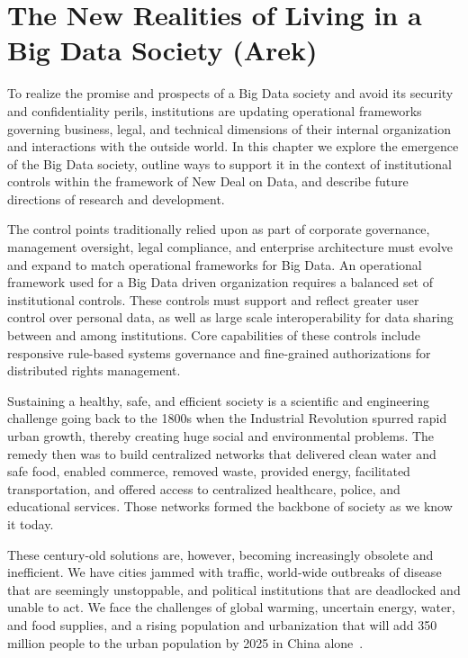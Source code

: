 \section{The New Realities of Living in a Big Data Society (Arek)}

To realize the promise and prospects of a Big Data society and avoid its security and confidentiality perils, institutions are updating operational frameworks governing business, legal, and technical dimensions of their internal organization and interactions with the outside world.
In this chapter we explore the emergence of the Big Data society, outline ways to support it in the context of institutional controls within the framework of New Deal on Data, and describe future directions of research and development.

The control points traditionally relied upon as part of corporate governance, management oversight, legal compliance, and enterprise architecture must evolve and expand to match operational frameworks for Big Data.
An operational framework used for a Big Data driven organization requires a balanced set of institutional controls.
These controls must support and reflect greater user control over personal data, as well as large scale interoperability for data sharing between and among institutions.
Core capabilities of these controls include responsive rule-based systems governance and fine-grained authorizations for distributed rights management.

Sustaining a healthy, safe, and efficient society is a scientific and engineering challenge going back to the 1800s when the Industrial Revolution spurred rapid urban growth, thereby creating huge social and environmental problems.
The remedy then was to build centralized networks that delivered clean water and safe food, enabled commerce, removed waste, provided energy, facilitated transportation, and offered access to centralized healthcare, police, and educational services.
Those networks formed the backbone of society as we know it today.

These century-old solutions are, however, becoming increasingly obsolete and inefficient.
We have cities jammed with traffic, world-wide outbreaks of disease that are seemingly unstoppable, and political institutions that are deadlocked and unable to act.
We face the challenges of global warming, uncertain energy, water, and food supplies, and a rising population and urbanization that will add 350 million people to the urban population by 2025 in China alone~\cite{cities2009}.

